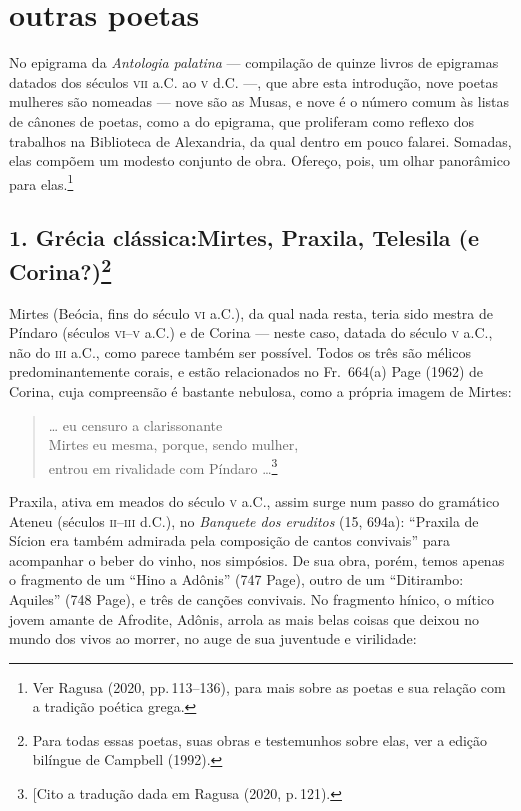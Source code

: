 \section*{outras poetas}

No epigrama da \textit{Antologia palatina} --- compilação de quinze livros de
epigramas datados dos séculos \textsc{vii} a.C. ao \textsc{v} d.C. ---, que abre esta introdução,
nove poetas mulheres são nomeadas --- nove são as Musas, e nove é o número comum
às listas de cânones de poetas, como a do epigrama, que proliferam como reflexo
dos trabalhos na Biblioteca de Alexandria, da qual dentro em pouco falarei.
Somadas, elas compõem um modesto conjunto de obra.
Ofereço, pois, um olhar panorâmico para elas.\footnote{Ver Ragusa (2020, pp.\,113--136), para mais sobre as poetas e sua relação com a tradição poética grega.}

\subsection*{1. Grécia clássica:\break Mirtes, Praxila, Telesila (e
Corina?)\protect\footnote{\MakeUppercase{P}ara todas essas poetas, suas obras e testemunhos sobre elas, ver a edição bilíngue de \MakeUppercase{C}ampbell (1992).}}

\smallskip

Mirtes (Beócia, fins do século \textsc{vi} a.C.), da qual nada resta, teria sido mestra
de Píndaro (séculos \textsc{vi}--\textsc{v} a.C.) e de Corina --- neste caso, datada do século \textsc{v}
a.C., não do \textsc{iii} a.C., como parece também ser possível. Todos os três são
mélicos predominantemente corais, e estão relacionados no Fr.~664(a)
Page (1962) de Corina, cuja compreensão
é bastante nebulosa, como a própria imagem de Mirtes:


\begin{quote}
\ldots{} eu censuro a clarissonante\\
Mirtes eu mesma, porque, sendo mulher,\\
entrou em rivalidade com Píndaro \ldots{}\footnote{[Cito a tradução dada em Ragusa (2020, p.\,121).}
\end{quote}

Praxila, ativa em meados do século \textsc{v} a.C., assim surge num passo do gramático
Ateneu (séculos \textsc{ii}--\textsc{iii} d.C.), no \textit{Banquete dos eruditos} (15, 694a):
``Praxila de Sícion era também admirada pela composição de cantos
convivais” para acompanhar o beber do vinho, nos simpósios. De sua obra,
porém, temos apenas o fragmento de um “Hino a Adônis” (747 Page), outro
de um “Ditirambo: Aquiles” (748 Page), e três de canções convivais. No fragmento
hínico, o mítico jovem amante de Afrodite, Adônis, arrola as mais belas coisas
que deixou no mundo dos vivos ao morrer, no auge de sua juventude e virilidade:

